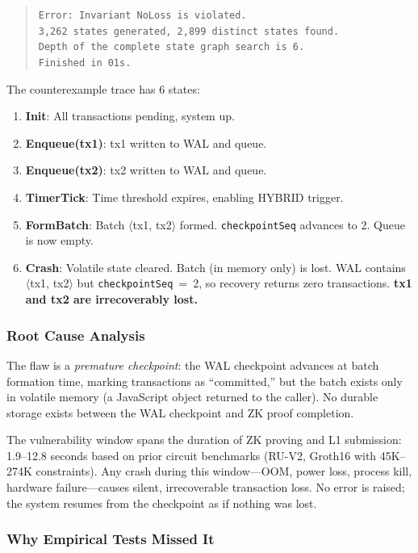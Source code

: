 \begin{quote}
\texttt{Error: Invariant NoLoss is violated.}\\
\texttt{3,262 states generated, 2,899 distinct states found.}\\
\texttt{Depth of the complete state graph search is 6.}\\
\texttt{Finished in 01s.}
\end{quote}

The counterexample trace has 6 states:

\begin{enumerate}
\item \textbf{Init}: All transactions pending, system up.
\item \textbf{Enqueue(tx1)}: tx1 written to WAL and queue.
\item \textbf{Enqueue(tx2)}: tx2 written to WAL and queue.
\item \textbf{TimerTick}: Time threshold expires, enabling HYBRID trigger.
\item \textbf{FormBatch}: Batch $\langle$tx1, tx2$\rangle$ formed.
  \texttt{checkpointSeq} advances to 2. Queue is now empty.
\item \textbf{Crash}: Volatile state cleared. Batch (in memory only) is lost.
  WAL contains $\langle$tx1, tx2$\rangle$ but \texttt{checkpointSeq}~=~2,
  so recovery returns zero transactions. \textbf{tx1 and tx2 are irrecoverably
  lost.}
\end{enumerate}

\subsubsection{Root Cause Analysis}

The flaw is a \emph{premature checkpoint}: the WAL checkpoint advances at
batch formation time, marking transactions as ``committed,'' but the batch
exists only in volatile memory (a JavaScript object returned to the caller).
No durable storage exists between the WAL checkpoint and ZK proof completion.

The vulnerability window spans the duration of ZK proving and L1 submission:
1.9--12.8 seconds based on prior circuit benchmarks (RU-V2, Groth16 with
45K--274K constraints). Any crash during this window---OOM, power loss,
process kill, hardware failure---causes silent, irrecoverable transaction
loss. No error is raised; the system resumes from the checkpoint as if
nothing was lost.

\subsubsection{Why Empirical Tests Missed It}

